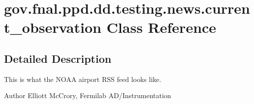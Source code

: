 \hypertarget{classgov_1_1fnal_1_1ppd_1_1dd_1_1testing_1_1news_1_1current__observation}{\section{gov.\-fnal.\-ppd.\-dd.\-testing.\-news.\-current\-\_\-observation Class Reference}
\label{classgov_1_1fnal_1_1ppd_1_1dd_1_1testing_1_1news_1_1current__observation}
}


\subsection{Detailed Description}
This is what the N\-O\-A\-A airport R\-S\-S feed looks like.

\begin{DoxyAuthor}{Author}
Elliott Mc\-Crory, Fermilab A\-D/\-Instrumentation 
\end{DoxyAuthor}
